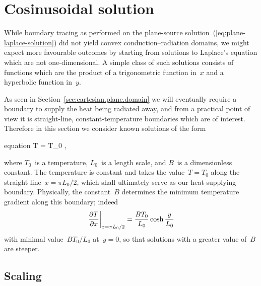 \begin{figure}
\end{figure}

\section{Cosinusoidal solution}
\label{sec:cartesian.cosine}

While boundary tracing as performed on
the plane-source solution~(\ref{eq:plane-laplace-solution})
did not yield convex conduction--radiation domains,
we might expect more favourable outcomes
by starting from solutions to Laplace's equation
which are not one-dimensional.
A simple class of such solutions consists of functions which are the product
of a trigonometric function in~$x$ and a hyperbolic function in~$y$.

As seen in Section~\ref{sec:cartesian.plane.domain}
we will eventually require a boundary to supply the heat being radiated away,
and from a practical point of view it is
straight-line, constant-temperature boundaries which are of interest.
Therefore in this section we consider known solutions of the form
\begin{important}{equation}
  T = T_0 ,
  \label{eq:cosine-laplace-solution}
\end{important}
where $T_0$~is a temperature, $L_0$~is a length scale,
and $B$~is a dimensionless constant.
The temperature is constant and takes the value~$T = T_0$
along the straight line~$x = \pi L_0/2$,
which shall ultimately serve as our heat-supplying boundary.
Physically, the constant~$B$ determines
the minimum temperature gradient along this boundary;
indeed
\begin{equation}
  \eval*{\pder{T}{x}}_{x = \pi L_0/2} = \frac{B T_0}{L_0} \cosh\frac{y}{L_0}
  \label{eq:cosine-laplace-solution-dirichlet-slope}
\end{equation}
with minimal value~$B T_0 / L_0$ at~$y = 0$,
so that solutions with a greater value of~$B$ are steeper.

\subsection{Scaling}
\label{sec:cartesian.cosine.scaling}

